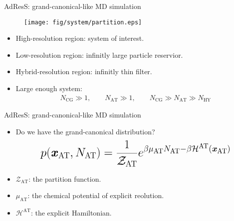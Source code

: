 \documentclass[]{beamer}
\newcommand{\redc}[1]{{\color{red} #1}}
\newcommand{\bluec}[1]{{\color{blue} #1}}
\newcommand{\vect}[1]{\textbf{\textit{#1}}}
\newcommand{\AT}{{\textrm{{AT}}}}
\newcommand{\EX}{{\textrm{AT}}}
\newcommand{\CG}{{\textrm{CG}}}
\newcommand{\HY}{{\textrm{HY}}}
\begin{document}
\begin{frame}{AdResS: grand-canonical-like MD simulation}
    \vfill
  \begin{figure}
    \centering 
    \texttt{[image: fig/system/partition.eps]}
  \end{figure}
  \begin{itemize}
    \vfill
  \item<1-> High-resolution region: system of interest.
    \vfill
  \item<2-> Low-resolution region: infinitly large particle reservior.
    \vfill
  \item<3-> Hybrid-resolution region: infinitly thin filter.
    \vfill
  \item <4-> Large enough system:
    \bluec{
      \begin{align*}
        N_\CG \gg 1,\qquad
        N_\AT \gg 1,\qquad
        N_\CG \gg N_\AT \gg N_\HY
      \end{align*}
    }
  \end{itemize}
    \vfill
\end{frame}


\begin{frame}{AdResS: grand-canonical-like MD simulation}  
  \vfill
  \begin{itemize}\itemsep .4cm
  \item <1->
    \bluec{Do we have the grand-canonical distribution?}
  \vfill
  \redc{
    \begin{align*}
      \mathlarger{\mathlarger{\mathlarger{
      p(\vect x_\AT, N_\AT) = \frac{1}{\mathcal Z_\EX}
      e^{\beta\mu_{\EX} N_\AT - \beta \mathcal H^{\EX}(\vect x_\AT)} }}}
    \end{align*}
  }      
  \vfill
  \item<2-> \bluec{$\mathcal Z_\EX$}: the partition function.
  \item<3-> \bluec{$\mu_{\EX}$}: the chemical potential of explicit reolution.
  \item<4-> \bluec{$\mathcal H^{\EX}$}: the explicit Hamiltonian.
  \end{itemize}
  \vfill
\end{frame}
\end{document}
